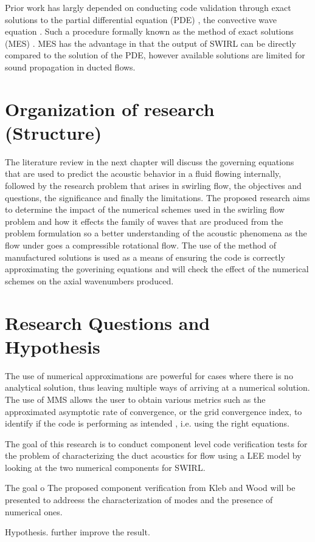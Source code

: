 Prior work has largly depended on conducting code validation through exact solutions
to the partial differential equation (PDE) , the convective wave equation . Such a
procedure formally known as the method of exact solutions (MES) \cite{MESref}. 
MES has the advantage in that the output of SWIRL can be directly compared 
to the solution of the PDE, however available solutions are limited for sound
propagation in ducted flows.


    
\section{Organization of research (Structure)}


The literature review in the next chapter will discuss the governing equations that are
used to predict the acoustic behavior in a fluid flowing internally, followed 
by the research problem that arises in swirling flow, the objectives and 
questions, the significance and finally the limitations.  The proposed research aims to determine the impact of the numerical schemes used
in the swirling flow problem and how it effects the family of waves that are
produced from the problem formulation so a better understanding of the 
acoustic phenomena as the flow under goes a compressible rotational flow. The use
of the method of manufactured solutions is used as a means of ensuring the code is
correctly approximating the goverining equations and will check the effect of the numerical schemes
on the axial wavenumbers produced.
 
\section{Research Questions and Hypothesis}

The use of numerical approximations are powerful for cases where 
there is no analytical solution, thus leaving multiple ways of arriving at a
numerical solution. The use of MMS allows the user to obtain various metrics
such as the approximated asymptotic rate of convergence, or the grid convergence index,
to identify if the code is performing as intended , i.e. using the right equations.


The goal of this research is to conduct component level code verification tests 
for the problem of characterizing the duct acoustics for flow using a LEE model 
by looking at the two numerical components for SWIRL.


The goal o
The proposed component verification from Kleb and Wood will 
be presented to addreess the characterization of 
modes and the presence of numerical ones. 

Hypothesis.
further improve the result. 


